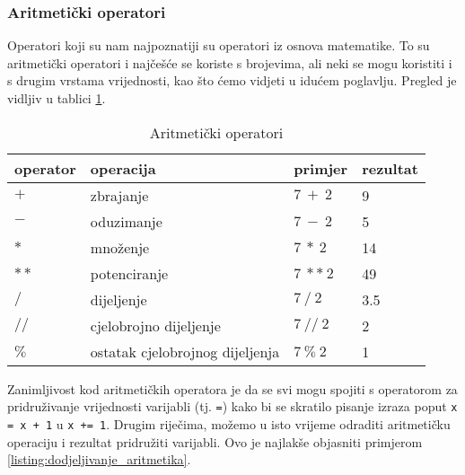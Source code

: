 \subsubsection{Aritmetički operatori}

Operatori koji su nam najpoznatiji su operatori iz osnova matematike. To su aritmetički operatori i najčešće se koriste s brojevima, ali neki se mogu koristiti i s drugim vrstama vrijednosti, kao što ćemo vidjeti u idućem poglavlju. Pregled je vidljiv u tablici \ref{tab:operatori-aritmetika}.


\begin{table}[h!]
    \begin{center}
        \caption{Aritmetički operatori}
        \label{tab:operatori-aritmetika}
        \begin{tabular}{llll}
        	\textbf{operator} & \textbf{operacija}              & \textbf{primjer} & \textbf{rezultat} \\ \hline
        	$\boldsymbol{+}$  & zbrajanje                       &    $7\:+\:2$     & 9                 \\
        	$\boldsymbol{-}$  & oduzimanje                      &    $7\:-\:2$     & 5                 \\
        	$\boldsymbol{*}$  & množenje                        &    $7\:*\:2$     & 14                \\
        	$\boldsymbol{**}$ & potenciranje                    &    $7\:**\:2$    & 49                \\
        	$\boldsymbol{/}$  & dijeljenje                      &    $7\:/\:2$     & 3.5               \\
        	$\boldsymbol{//}$ & cjelobrojno dijeljenje          &    $7\://\:2$    & 2                 \\
        	$\boldsymbol{\%}$ & ostatak cjelobrojnog dijeljenja &    $7\:\%\:2$    & 1
        \end{tabular}
    \end{center}
\end{table}


Zanimljivost kod aritmetičkih operatora je da se svi mogu spojiti s operatorom za pridruživanje vrijednosti varijabli (tj. \texttt{=}) kako bi se skratilo pisanje izraza poput \texttt{x = x + 1} u \texttt{x += 1}. Drugim riječima, možemo u isto vrijeme odraditi aritmetičku operaciju i rezultat pridružiti varijabli. Ovo je najlakše objasniti primjerom \ref{listing:dodjeljivanje_aritmetika}.


